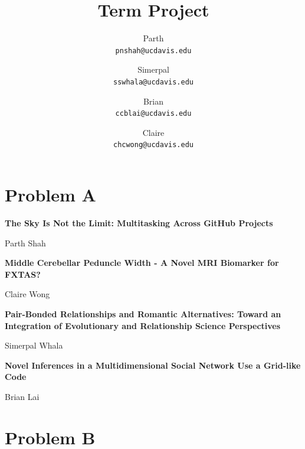 \documentclass[11pt]{article}
\title{Term Project}
\author{Parth\\
\texttt{pnshah@ucdavis.edu}\and Simerpal\\
\texttt{sswhala@ucdavis.edu}\and Brian\\
\texttt{ccblai@ucdavis.edu}\and Claire\\
\texttt{chcwong@ucdavis.edu}}
\begin{document}
\maketitle

\section*{{\LARGE\bfseries Problem A}}

\begin{center}
{\LARGE\bfseries The Sky Is Not the Limit: Multitasking Across GitHub Projects}

Parth Shah
\vspace{1cm}  
\end{center}

\newpage

\begin{center}
{\LARGE\bfseries Middle Cerebellar Peduncle Width - A Novel MRI Biomarker for FXTAS?}

Claire Wong
\vspace{1cm}  
\end{center}

\newpage

\begin{center}
{\LARGE\bfseries Pair-Bonded Relationships and
Romantic Alternatives: Toward an
Integration of Evolutionary and
Relationship Science Perspectives}

Simerpal Whala
\vspace{1cm}  
\end{center}

\newpage

\begin{center}
{\LARGE\bfseries Novel Inferences in a Multidimensional Social Network
Use a Grid-like Code}

Brian Lai
\vspace{1cm}  
\end{center}

\newpage

\section*{{\LARGE\bfseries Problem B}}

\\ 

\\ 
\end{document}
